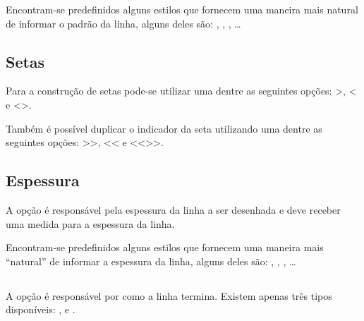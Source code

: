 
Encontram-se predefinidos alguns estilos que fornecem uma maneira mais natural de informar o padr\~{a}o da linha, alguns deles s\~{a}o: , , , \ldots


\subsection{Setas}
Para a constru\c{c}\~{a}o de setas pode-se utilizar uma dentre as seguintes op\c{c}\~{o}es: \lcode{-}\textgreater, \textless\lcode{-} e \textless\lcode{-}\textgreater.


Tamb\'{e}m \'{e} poss\'{i}vel duplicar o indicador da seta utilizando uma dentre as seguintes op\c{c}\~{o}es: \lcode{-}\textgreater\textgreater, \textless\textless\lcode{-} e \textless\textless\lcode{-}\textgreater\textgreater.


\subsection{Espessura}
A op\c{c}\~{a}o  \'{e} respons\'{a}vel pela espessura da linha a ser desenhada e deve receber uma medida para a espessura da linha.

Encontram-se predefinidos alguns estilos que fornecem uma maneira mais ``natural'' de informar a espessura da linha, alguns deles s\~{a}o: , ,  , \ldots


\subsection{}
A op\c{c}\~{a}o  \'{e} respons\'{a}vel por como a linha termina. Existem apenas tr\^{e}s tipos dispon\'{i}veis: ,  e .

